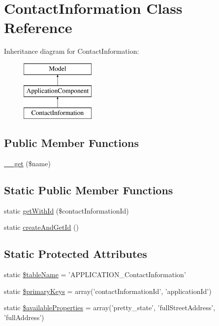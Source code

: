 \hypertarget{class_contact_information}{\section{Contact\-Information Class Reference}
\label{class_contact_information}
}
Inheritance diagram for Contact\-Information\-:\begin{figure}[H]
\begin{center}
\leavevmode
\includegraphics[height=3.000000cm]{class_contact_information}
\end{center}
\end{figure}
\subsection*{Public Member Functions}
\begin{DoxyCompactItemize}
\item 
\hyperlink{class_contact_information_a81ddb497923005380ba5769111b3355d}{\-\_\-\-\_\-get} (\$name)
\end{DoxyCompactItemize}
\subsection*{Static Public Member Functions}
\begin{DoxyCompactItemize}
\item 
static \hyperlink{class_contact_information_a1890d6b5a2aecd145dd3a5fb75b7a387}{get\-With\-Id} (\$contact\-Information\-Id)
\item 
static \hyperlink{class_contact_information_ac13356a455a14a73873c7dfcb52e0570}{create\-And\-Get\-Id} ()
\end{DoxyCompactItemize}
\subsection*{Static Protected Attributes}
\begin{DoxyCompactItemize}
\item 
static \hyperlink{class_contact_information_ade8c9fb16583d1acab57e21eca2cd921}{\$table\-Name} = 'A\-P\-P\-L\-I\-C\-A\-T\-I\-O\-N\-\_\-\-Contact\-Information'
\item 
static \hyperlink{class_contact_information_a3e4c130a0d3f11acfc63116a582d66e3}{\$primary\-Keys} = array('contact\-Information\-Id', 'application\-Id')
\item 
static \hyperlink{class_contact_information_adee9330a334a8a859b50b75e77570dd4}{\$available\-Properties} = array('pretty\-\_\-state', 'full\-Street\-Address', 'full\-Address')
\end{DoxyCompactItemize}
